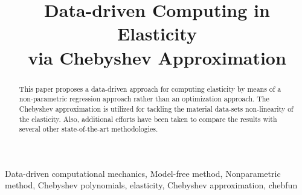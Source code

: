 \documentclass[conference]{IEEEtran}
\begin{document}
\title{Data-driven Computing in Elasticity \\via Chebyshev Approximation
{}
}

\author{
\and
{}


}

\maketitle

\begin{abstract}
This paper proposes a data-driven approach for computing elasticity by means of a non-parametric regression approach rather than an optimization approach. The Chebyshev approximation is utilized for tackling the material data-sets non-linearity of the elasticity. Also, additional efforts have been taken to compare the results with several other state-of-the-art methodologies.
\end{abstract}

\begin{IEEEkeywords}
Data-driven computational mechanics, Model-free method, Nonparametric method, Chebyshev polynomials, elasticity, Chebyshev approximation, chebfun
\end{IEEEkeywords}
\end{document}
